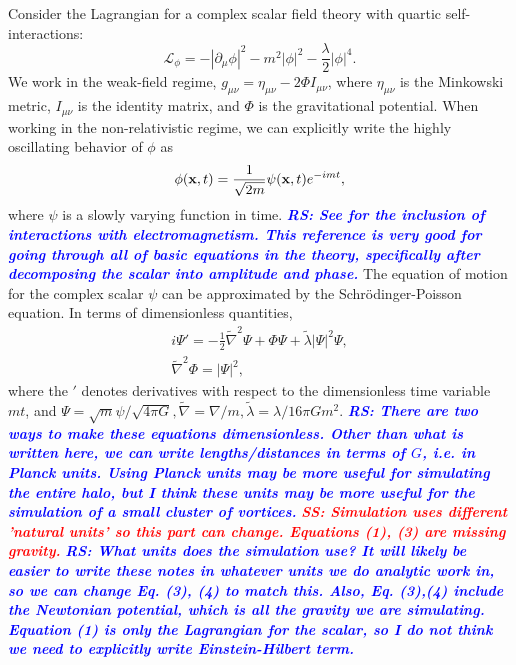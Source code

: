 \documentclass[onecolumn,nofootinbib,superscriptaddress]{revtex4}
\newcommand{\rs}[1]{\textcolor{blue}{\it{\textbf{RS: #1}}} }
\newcommand{\stst}[1]{\textcolor{red}{\it{\textbf{SS: #1}}} }
\begin{document}
Consider the Lagrangian for a complex scalar field theory with quartic self-interactions:
\begin{equation}
\mathcal{L}_{\phi} = -|\partial_\mu \phi|^2 - m^2|\phi|^2 - \frac{\lambda}{2}|\phi|^4.
\end{equation}
We work in the weak-field regime, $g_{\mu\nu} = \eta_{\mu\nu} -2\Phi I_{\mu\nu}$, where $\eta_{\mu\nu}$ is the Minkowski metric, $I_{\mu\nu}$ is the identity matrix, and $\Phi$ is the gravitational potential.  When working in the non-relativistic regime, we can explicitly write the highly oscillating behavior of $\phi$ as
\begin{equation}
\phi({\bf{x}},t) = \frac{1}{\sqrt{2m}}\psi({\bf{x}},t)e^{-imt},
\end{equation}
where $\psi$ is a slowly varying function in time.  {\rs{See \cite{Chavanis:2016shp} for the inclusion of interactions with electromagnetism. This reference is very good for going through all of basic equations in the theory, specifically after decomposing the scalar into amplitude and phase.}} The equation of motion for the complex scalar $\psi$ can be approximated by the Schr\"{o}dinger-Poisson equation.  In terms of dimensionless quantities,
\begin{gather}
i\Psi' = -\frac{1}{2}\tilde{\nabla}^2\Psi + \Phi\Psi + \tilde{\lambda}|\Psi|^2\Psi,\label{EQ:ScalarEoM}\\
\tilde{\nabla}^2\Phi = |\Psi|^2,
\end{gather}
where the $'$ denotes derivatives with respect to the dimensionless time variable $m t$, and $\Psi = \sqrt{m}\psi/\sqrt{4\pi G}, \tilde{\nabla} = \nabla /m, \tilde{\lambda} = \lambda/16\pi G m^2$. {\rs{There are two ways to make these equations dimensionless.  Other than what is written here, we can write lengths/distances in terms of $G$, i.e. in Planck units.  Using Planck units may be more useful for simulating the entire halo, but I think these units may be more useful for the simulation of a small cluster of vortices.}}  \stst{Simulation uses different 'natural units' so this part can change. Equations (1), (3) are missing gravity.}{\rs{What units does the simulation use?  It will likely be easier to write these notes in whatever units we do analytic work in, so we can change Eq. (3), (4) to match this.  Also, Eq. (3),(4) include the Newtonian potential, which is all the gravity we are simulating.  Equation (1) is only the Lagrangian for the scalar, so I do not think we need to explicitly write Einstein-Hilbert term.}}
\end{document}
